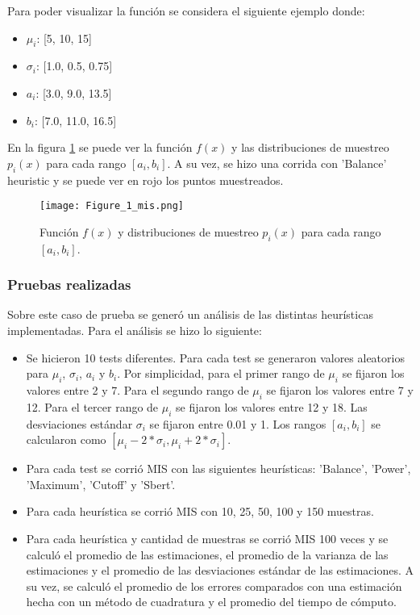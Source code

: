 \documentclass{article}
\begin{document}
Para poder visualizar la función se considera el siguiente ejemplo donde:

\begin{itemize}
    \item \textbf{\( \mu_{i} \)}: [5, 10, 15]
    \item \textbf{\( \sigma_{i} \)}: [1.0, 0.5, 0.75]
    \item \textbf{\( a_{i} \)}: [3.0, 9.0, 13.5]
    \item \textbf{\( b_{i} \)}: [7.0, 11.0, 16.5]
\end{itemize}

En la figura \ref{fig:mis1} se puede ver la función \( f(x) \) y las distribuciones de muestreo \( p_{i}(x) \) para cada rango \( [a_{i}, b_{i}] \).
A su vez, se hizo una corrida con 'Balance' heuristic y se puede ver en rojo los puntos muestreados.

\begin{figure}[H]
\texttt{[image: Figure\_1\_mis.png]}
\caption{Función \( f(x) \) y distribuciones de muestreo \( p_{i}(x) \) para cada rango \( [a_{i}, b_{i}] \).}
\label{fig:mis1}
\end{figure}

\subsubsection{Pruebas realizadas}

Sobre este caso de prueba se generó un análisis de las distintas heurísticas implementadas.
Para el análisis se hizo lo siguiente:
\begin{itemize}
    \item Se hicieron 10 tests diferentes. Para cada test se generaron valores aleatorios para \( \mu_{i} \), \( \sigma_{i} \), \( a_{i} \) y \( b_{i} \).
          Por simplicidad, para el primer rango de  \( \mu_{i} \) se fijaron los valores entre 2 y 7.
          Para el segundo rango de \( \mu_{i} \) se fijaron los valores entre 7 y 12.
          Para el tercer rango de \( \mu_{i} \) se fijaron los valores entre 12 y 18.
          Las desviaciones estándar \( \sigma_{i} \) se fijaron entre 0.01 y 1.
          Los rangos \( [a_{i}, b_{i}] \) se calcularon como \( [ \mu_{i} - 2 * \sigma_{i}, \mu_{i} + 2 * \sigma_{i} ] \).
    \item Para cada test se corrió MIS con las siguientes heurísticas: 'Balance', 'Power', 'Maximum', 'Cutoff' y 'Sbert'.
    \item Para cada heurística se corrió MIS con 10, 25, 50, 100 y 150 muestras.
    \item Para cada heurística y cantidad de muestras se corrió MIS 100 veces y se calculó el promedio de las estimaciones,
          el promedio de la varianza de las estimaciones y el promedio de las desviaciones estándar de las estimaciones.
          A su vez, se calculó el promedio de los errores comparados con una estimación hecha con un método de cuadratura y el promedio del tiempo de cómputo.
\end{itemize}
\end{document}
